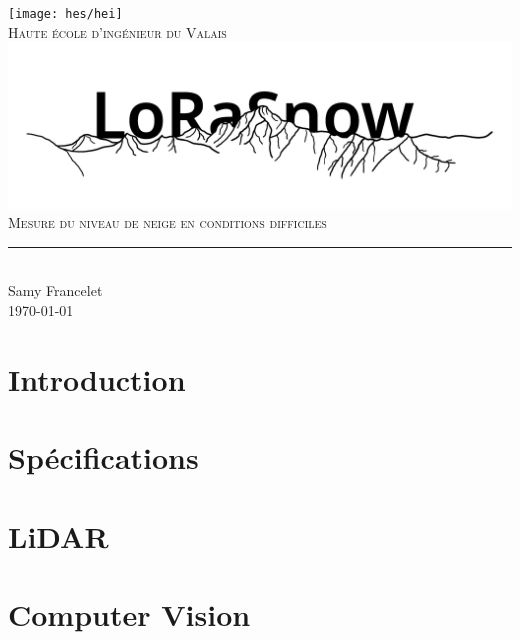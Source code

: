 \documentclass[11pt,titlepage]{report}
\begin{document}
\begin{titlepage}
	\centering
    \texttt{[image: hes/hei]}\\[1cm] 	%
    \textsc{\LARGE Haute école d'ingénieur du Valais}\\ \vspace{\fill}
    \includegraphics[width=\linewidth]{Images/Logo_LoRaSnow.png}\\ \vspace{\fill}
	\textsc{\LARGE Mesure du niveau de neige en conditions difficiles}\\[0.4cm]
	\rule{\linewidth}{0.2 mm} \\[0.5 cm]
	Samy Francelet \\
	\today
\end{titlepage}
\restoregeometry

\tableofcontents
\listoffigures
\listoftables

\chapter{Introduction}


\chapter{Spécifications}


\chapter{LiDAR}



\chapter{Computer Vision}




\printbibliography[heading=bibintoc]
\end{document}
